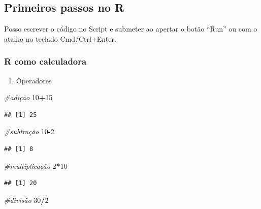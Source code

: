 \documentclass[
]{book}
\newenvironment{Shaded}{\begin{snugshade}}{\end{snugshade}}
\newcommand{\CommentTok}[1]{\textcolor[rgb]{0.56,0.35,0.01}{\textit{#1}}}
\newcommand{\DecValTok}[1]{\textcolor[rgb]{0.00,0.00,0.81}{#1}}
\newcommand{\OperatorTok}[1]{\textcolor[rgb]{0.81,0.36,0.00}{\textbf{#1}}}
\providecommand{\tightlist}{%
  \setlength{\itemsep}{0pt}\setlength{\parskip}{0pt}}
\begin{document}
\hypertarget{primeiros-passos-no-r}{%
\subsection{Primeiros passos no R}\label{primeiros-passos-no-r}}

Posso escrever o código no Script e submeter ao apertar o botão ``Run'' ou com o atalho no teclado Cmd/Ctrl+Enter.

\hypertarget{r-como-calculadora}{%
\subsubsection{R como calculadora}\label{r-como-calculadora}}

\begin{enumerate}
\def\labelenumi{\arabic{enumi})}
\tightlist
\item
  Operadores
\end{enumerate}

\begin{Shaded}
\begin{Highlighting}[]
\CommentTok{#adição}
\DecValTok{10}\OperatorTok{+}\DecValTok{15}
\end{Highlighting}
\end{Shaded}

\begin{verbatim}
## [1] 25
\end{verbatim}

\begin{Shaded}
\begin{Highlighting}[]
\CommentTok{#subtração}
\DecValTok{10-2}
\end{Highlighting}
\end{Shaded}

\begin{verbatim}
## [1] 8
\end{verbatim}

\begin{Shaded}
\begin{Highlighting}[]
\CommentTok{#multiplicação}
\DecValTok{2}\OperatorTok{*}\DecValTok{10}
\end{Highlighting}
\end{Shaded}

\begin{verbatim}
## [1] 20
\end{verbatim}

\begin{Shaded}
\begin{Highlighting}[]
\CommentTok{#divisão}
\DecValTok{30}\OperatorTok{/}\DecValTok{2}
\end{Highlighting}
\end{Shaded}
\end{document}

